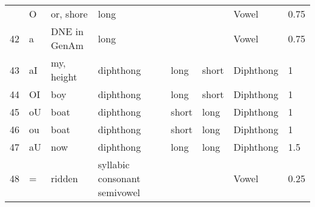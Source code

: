 \begin {longtable}{ llll llll l}
{\rowcolor [gray]{.8}41&O&or, shore&long&&&&Vowel&0.75
\\ 
\rowcolor [gray]{.7}42&a&DNE in GenAm&long&&&&Vowel&0.75
\\ 
\rowcolor [gray]{.8}43&aI&my, height&diphthong&&long&short&Diphthong&1
\\ 
\rowcolor [gray]{.7}44&OI&boy&diphthong&&long&short&Diphthong&1
\\ 
\rowcolor [gray]{.8}45&oU&boat&diphthong&&short&long&Diphthong&1
\\ 
\rowcolor [gray]{.7}46&ou&boat&diphthong&&short&long&Diphthong&1
\\ 
\rowcolor [gray]{.8}47&aU&now&diphthong&&long&long&Diphthong&1.5
\\ 
\rowcolor [gray]{.7}48&=&ridden&syllabic consonant semivowel&&&&Vowel&0.25\\ 

\end {longtable}